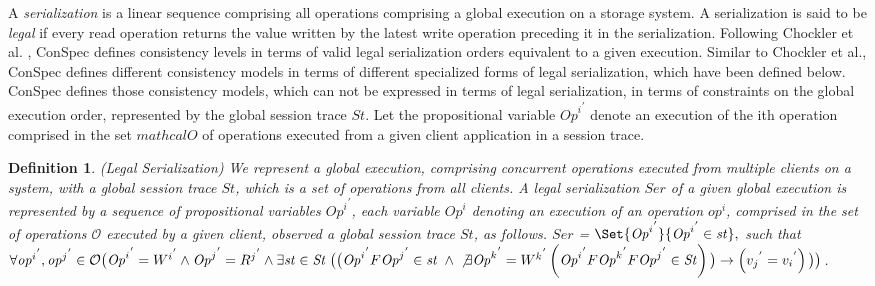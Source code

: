 \documentclass{sig-alternate-05-2015}
\begin{document}
  \par %
  A \emph{serialization} is a linear sequence comprising all operations comprising a global  execution on a
  storage system.
  A serialization is said to be \emph{legal} if every read operation returns the value written by the latest write
   operation preceding it in the serialization.  Following Chockler et al. \cite{Chockler2000}, ConSpec defines
   consistency levels in terms of valid legal serialization orders equivalent to a given execution. Similar to Chockler et al., ConSpec defines different consistency models in terms of different specialized forms of legal serialization, which have been defined below. ConSpec defines those consistency models, which can not be expressed in terms of legal serialization, in terms of constraints on the global execution order,  represented by the global session trace $\mathit{St}$.
   Let the propositional variable ${\mathit{Op}^i}^{'}$ denote an execution of the
   i\textquotesingle th operation comprised in the set $mathcal{O}$ of operations executed from a given client application in a session trace.

    \newtheorem{definition}{Definition}
     \begin{definition}(Legal Serialization)
   We represent a global execution, comprising concurrent operations executed from multiple clients on a system, with a global session trace $\mathit{St}$, which is a set of operations from all clients. A legal serialization $\mathit{Ser}$ of a given global execution is represented by a sequence of propositional variables ${\mathit{Op}^i}^{'}$, each variable ${\mathit{Op}^i}$ denoting an execution of an
    operation ${\mathit{op}}^i$, comprised in the set of operations $\mathcal{O}$ executed by a given client, observed a global session trace $\mathit{St}$, as follows.
   $\mathit{Ser}$ = $\Set{ {\mathit{Op}^i}^{'} } {{\mathit{Op}^i}^{'} \in \mathit{st}}, $ such that
   $\forall {\mathit{op}^i}^{'}, {\mathit{op}^j}^{'} \in \mathcal{O} \\ \big( {\mathit{Op}^i}^{'} = {W^i}^{'} \wedge {\mathit{Op}^j}^{'} = {R^j}^{'}  \wedge \exists \mathit{st} \in \mathit{St}  \; \big( \big( {\mathit{Op}^i}^{'} F {\mathit{Op}^j}^{'} \in \mathit{st}  \; \wedge \\
   \not\exists {\mathit{Op}^k}^{'} = {W^k}^{'} \left( {\mathit{Op}^i}^{'}  F {\mathit{Op}^k}^{'} F {\mathit{Op}^j}^{'} \in \mathit{St}  \right) \big)
  \rightarrow \left( {v_j}^{'} = {v_i}^{'} \right) \big) \big)$.
    \end{definition}\label{def:ser}
\end{document}
